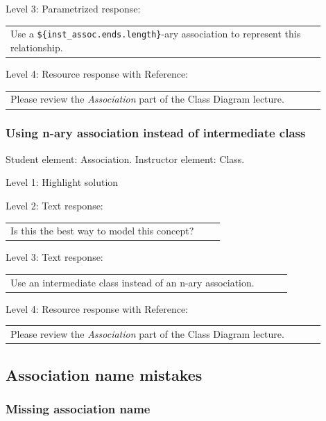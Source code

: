 \noindent Level 3: Parametrized response: \medskip

\begin{tabular}{|p{0.9\linewidth}}
Use a \verb|${inst_assoc.ends.length}|-ary association to represent this relationship.
\end{tabular} \medskip

\noindent Level 4: Resource response with Reference: \medskip

\begin{tabular}{|p{0.9\linewidth}}
Please review the \textit{Association} part of the Class Diagram lecture.
\end{tabular} \medskip


\subsubsection{Using n-ary association instead of intermediate class}

Student element: Association. Instructor element: Class. \medskip

\noindent Level 1: Highlight solution  \medskip

\noindent Level 2: Text response: \medskip

\begin{tabular}{|p{0.9\linewidth}}
Is this the best way to model this concept?
\end{tabular} \medskip

\noindent Level 3: Text response: \medskip

\begin{tabular}{|p{0.9\linewidth}}
Use an intermediate class instead of an n-ary association.
\end{tabular} \medskip

\noindent Level 4: Resource response with Reference: \medskip

\begin{tabular}{|p{0.9\linewidth}}
Please review the \textit{Association} part of the Class Diagram lecture.
\end{tabular} \medskip


\subsection{Association name mistakes}

\subsubsection{Missing association name}

